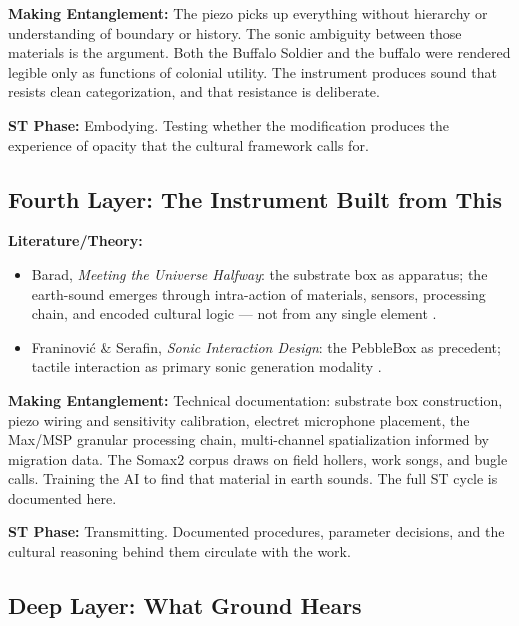 \noindent\textbf{Making Entanglement:} The piezo picks up everything without hierarchy or understanding of boundary or history. The sonic ambiguity between those materials is the argument. Both the Buffalo Soldier and the buffalo were rendered legible only as functions of colonial utility. The instrument produces sound that resists clean categorization, and that resistance is deliberate.

\noindent\textbf{ST Phase:} Embodying. Testing whether the modification produces the experience of opacity that the cultural framework calls for.

\medskip

\subsection*{Fourth Layer: The Instrument Built from This}

\noindent\textbf{Literature/Theory:}
\begin{itemize}[noitemsep]
    \item Barad, \textit{Meeting the Universe Halfway}: the substrate box as apparatus; the earth-sound emerges through intra-action of materials, sensors, processing chain, and encoded cultural logic — not from any single element \parencite{Barad_2007}.
    \item Franinović \& Serafin, \textit{Sonic Interaction Design}: the PebbleBox as precedent; tactile interaction as primary sonic generation modality \parencite{Franinovic_Serafin_2013}.
\end{itemize}

\noindent\textbf{Making Entanglement:} Technical documentation: substrate box construction, piezo wiring and sensitivity calibration, electret microphone placement, the Max/MSP granular processing chain, multi-channel spatialization informed by migration data. The Somax2 corpus draws on field hollers, work songs, and bugle calls. Training the AI to find that material in earth sounds. The full ST cycle is documented here.

\noindent\textbf{ST Phase:} Transmitting. Documented procedures, parameter decisions, and the cultural reasoning behind them circulate with the work.

\medskip

\subsection*{Deep Layer: What Ground Hears}

